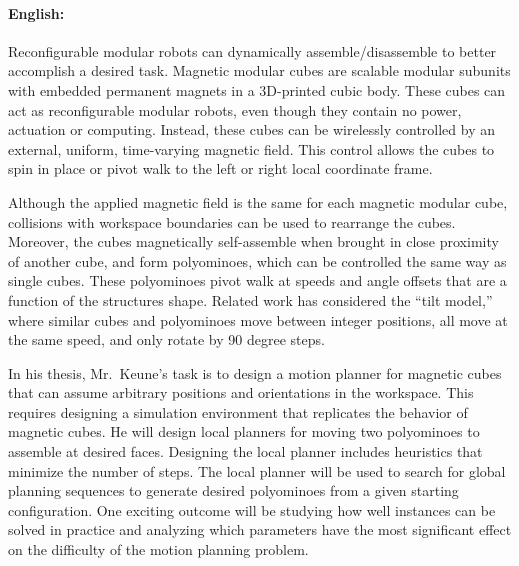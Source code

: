 \documentclass[11pt,a4paper,twoside,titlepage]{scrbook}
\theoremstyle{definition}
\begin{document}
\newpage

\paragraph{English:}
Reconfigurable modular robots can dynamically assemble/disassemble to better accomplish a desired task.
Magnetic modular cubes are scalable modular subunits with embedded permanent magnets in a 3D-printed cubic body.
These cubes can act as reconfigurable modular robots, even though they contain no power, actuation or computing.
Instead, these cubes can be wirelessly controlled by an external, uniform, time-varying magnetic field.
This control allows the cubes to spin in place or pivot walk to the left or right local coordinate frame.
 
Although the applied magnetic field is the same for each magnetic modular cube, collisions with workspace boundaries can be used to rearrange the cubes.
Moreover, the cubes magnetically self-assemble when brought in close proximity of another cube, and form polyominoes, which can be controlled the same way as single cubes. 
These polyominoes pivot walk at speeds and angle offsets that are a function of the structures shape. 
Related work has considered the ``tilt model,'' where similar cubes and polyominoes move between integer positions, all move at the same speed, and only rotate by 90 degree steps.

In his thesis, Mr.\ Keune's task is to design a motion planner for magnetic cubes that can assume arbitrary positions and orientations in the workspace.
This requires designing a simulation environment that replicates the behavior of magnetic cubes.
He will design local planners for moving two polyominoes to assemble at desired faces.
Designing the local planner includes heuristics that minimize the number of steps.
The local planner will be used to search for global planning sequences to generate desired polyominoes from a given starting configuration.
One exciting outcome will be studying how well instances can be solved in practice and analyzing which parameters have the most significant effect on the difficulty of the motion planning problem. 
	
	
	
	\tableofcontents
	
	\listoffigures
	
	
	
	\mainmatter
	
	
	
	
	
	
	
	
	
	
	
\end{document}
